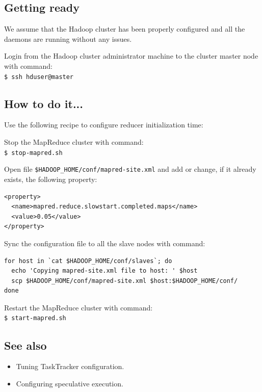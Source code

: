 \subsection*{Getting ready}
We assume that the Hadoop cluster has been properly configured and all the daemons are running without any issues.

Login from the Hadoop cluster administrator machine to the cluster master node with command: \\
\verb|$ ssh hduser@master|

\subsection*{How to do it...}
Use the following recipe to configure reducer initialization time:

Stop the MapReduce cluster with command: \\
\verb|$ stop-mapred.sh|

Open file \verb|$HADOOP_HOME/conf/mapred-site.xml| and add or change, if it already exists, the following property:
\lstset{style=bashstyle}
\begin{lstlisting}
<property>
  <name>mapred.reduce.slowstart.completed.maps</name>
  <value>0.05</value>
</property>
\end{lstlisting}


Sync the configuration file to all the slave nodes with command:
\lstset{style=bashstyle}
\begin{lstlisting}
for host in `cat $HADOOP_HOME/conf/slaves`; do
  echo 'Copying mapred-site.xml file to host: ' $host
  scp $HADOOP_HOME/conf/mapred-site.xml $host:$HADOOP_HOME/conf/
done
\end{lstlisting}

Restart the MapReduce cluster with command: \\
\verb|$ start-mapred.sh|

\subsection*{See also}
\begin{itemize}
  \item Tuning TaskTracker configuration.
  \item Configuring speculative execution.
\end{itemize}
